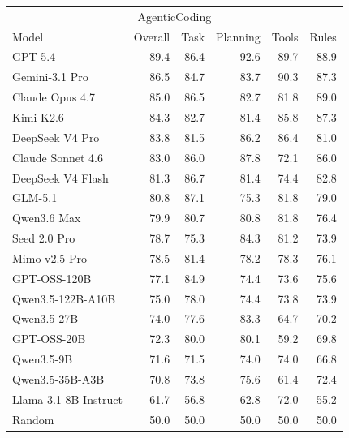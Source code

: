 \begin{tabular}{lrrrrr}
\toprule
\multicolumn{6}{c}{AgenticCoding} \\
Model & Overall & Task & Planning & Tools & Rules \\
\midrule
GPT-5.4 & 89.4 & 86.4 & 92.6 & 89.7 & 88.9 \\
Gemini-3.1 Pro & 86.5 & 84.7 & 83.7 & 90.3 & 87.3 \\
Claude Opus 4.7 & 85.0 & 86.5 & 82.7 & 81.8 & 89.0 \\
Kimi K2.6 & 84.3 & 82.7 & 81.4 & 85.8 & 87.3 \\
DeepSeek V4 Pro & 83.8 & 81.5 & 86.2 & 86.4 & 81.0 \\
Claude Sonnet 4.6 & 83.0 & 86.0 & 87.8 & 72.1 & 86.0 \\
DeepSeek V4 Flash & 81.3 & 86.7 & 81.4 & 74.4 & 82.8 \\
GLM-5.1 & 80.8 & 87.1 & 75.3 & 81.8 & 79.0 \\
Qwen3.6 Max & 79.9 & 80.7 & 80.8 & 81.8 & 76.4 \\
Seed 2.0 Pro & 78.7 & 75.3 & 84.3 & 81.2 & 73.9 \\
Mimo v2.5 Pro & 78.5 & 81.4 & 78.2 & 78.3 & 76.1 \\
GPT-OSS-120B & 77.1 & 84.9 & 74.4 & 73.6 & 75.6 \\
Qwen3.5-122B-A10B & 75.0 & 78.0 & 74.4 & 73.8 & 73.9 \\
Qwen3.5-27B & 74.0 & 77.6 & 83.3 & 64.7 & 70.2 \\
GPT-OSS-20B & 72.3 & 80.0 & 80.1 & 59.2 & 69.8 \\
Qwen3.5-9B & 71.6 & 71.5 & 74.0 & 74.0 & 66.8 \\
Qwen3.5-35B-A3B & 70.8 & 73.8 & 75.6 & 61.4 & 72.4 \\
Llama-3.1-8B-Instruct & 61.7 & 56.8 & 62.8 & 72.0 & 55.2 \\
\midrule
Random & 50.0 & 50.0 & 50.0 & 50.0 & 50.0 \\
\bottomrule
\end{tabular}
